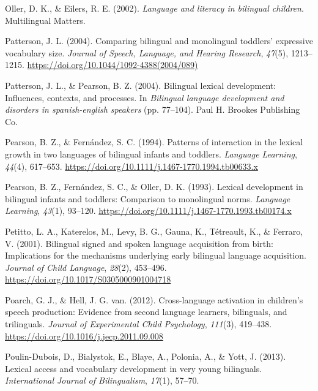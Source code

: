 \documentclass[
]{article}
\newlength{\cslhangindent}
\newlength{\cslentryspacingunit} %
\newenvironment{CSLReferences}[2] %
 {%
  \setlength{\parindent}{0pt}
  \ifodd #1
  \let\oldpar\par
  \def\par{\hangindent=\cslhangindent\oldpar}
  \fi
  \setlength{\parskip}{#2\cslentryspacingunit}
 }%
 {}
\begin{document}
\begin{CSLReferences}{1}{0}
\leavevmode{}%
Oller, D. K., \& Eilers, R. E. (2002). \emph{Language and literacy in
bilingual children}. Multilingual Matters.

\leavevmode{}%
Patterson, J. L. (2004). Comparing bilingual and monolingual toddlers'
expressive vocabulary size. \emph{Journal of Speech, Language, and
Hearing Research}, \emph{47}(5), 1213--1215.
\url{https://doi.org/10.1044/1092-4388(2004/089)}

\leavevmode{}%
Patterson, J. L., \& Pearson, B. Z. (2004). Bilingual lexical
development: Influences, contexts, and processes. In \emph{Bilingual
language development and disorders in spanish-english speakers} (pp.
77--104). Paul H. Brookes Publishing Co.

\leavevmode{}%
Pearson, B. Z., \& Fernández, S. C. (1994). Patterns of interaction in
the lexical growth in two languages of bilingual infants and toddlers.
\emph{Language Learning}, \emph{44}(4), 617--653.
\url{https://doi.org/10.1111/j.1467-1770.1994.tb00633.x}

\leavevmode{}%
Pearson, B. Z., Fernández, S. C., \& Oller, D. K. (1993). Lexical
development in bilingual infants and toddlers: Comparison to monolingual
norms. \emph{Language Learning}, \emph{43}(1), 93--120.
\url{https://doi.org/10.1111/j.1467-1770.1993.tb00174.x}

\leavevmode{}%
Petitto, L. A., Katerelos, M., Levy, B. G., Gauna, K., Tétreault, K., \&
Ferraro, V. (2001). Bilingual signed and spoken language acquisition
from birth: Implications for the mechanisms underlying early bilingual
language acquisition. \emph{Journal of Child Language}, \emph{28}(2),
453--496. \url{https://doi.org/10.1017/S0305000901004718}

\leavevmode{}%
Poarch, G. J., \& Hell, J. G. van. (2012). Cross-language activation in
children's speech production: Evidence from second language learners,
bilinguals, and trilinguals. \emph{Journal of Experimental Child
Psychology}, \emph{111}(3), 419--438.
\url{https://doi.org/10.1016/j.jecp.2011.09.008}

\leavevmode{}%
Poulin-Dubois, D., Bialystok, E., Blaye, A., Polonia, A., \& Yott, J.
(2013). Lexical access and vocabulary development in very young
bilinguals. \emph{International Journal of Bilingualism}, \emph{17}(1),
57--70.


\end{CSLReferences}
\end{document}
